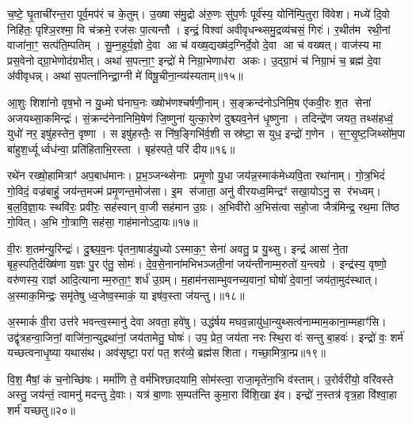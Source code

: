 च॒ष्टे॒ घृ॒ताची॑रन्त॒रा पूर्व॒मप॑रं च के॒तुम्। उ॒ख्षा स॑मु॒द्रो अ॑रु॒णः सु॑प॒र्णः पूर्व॑स्य॒ योनि॑म्पि॒तुरा वि॑वेश। मध्ये॑ दि॒वो निहि॑तः॒ पृश्ञि॒रश्मा॒ वि च॑क्रमे॒ रज॑सः पा॒त्यन्तौ। इन्द्रं॒ विश्वा॑ अवीवृधन्थ्समु॒द्रव्य॑चसं॒ गिरः॑। र॒थीत॑म रथी॒नां वाजा॑ना॒ꣳ॒ सत्प॑ति॒म्पतिम्। सु॒म्न॒हूर्य॒ज्ञो दे॒वा आ च॑ वख्ष॒द्यख्ष॑द॒ग्निर्दे॒वो दे॒वा आ च॑ वख्षत्। वाज॑स्य मा प्रस॒वेनोद्ग्रा॒भेणोद॑ग्रभीत्। अथा॑ स॒पत्ना॒ꣳ॒ इन्द्रो॑ मे निग्रा॒भेणाध॑रा अकः। उ॒द्ग्रा॒भं च॑ निग्रा॒भं च॒ ब्रह्म॑ दे॒वा अ॑वीवृधन्न्। अथा॑ स॒पत्ना॑निन्द्रा॒ग्नी मे॑ विषू॒चीना॒न्व्य॑स्यताम्॥१५॥

{\anuvakamend[{दे॒वाः श॒तप॑या अ॒भि वाज॑स्य॒ षड्विꣳ॑शतिश्च॥३॥}]}

आ॒शुः शिशा॑नो वृष॒भो न यु॒ध्मो घ॑नाघ॒नः ख्षोभ॑णश्चर्\mbox{}षणी॒नाम्। स॒ङ्क्रन्द॑नोऽनिमि॒ष ए॑कवी॒रः श॒त सेना॑ अजयथ्सा॒कमिन्द्रः॑। सं॒क्रन्द॑नेनानिमि॒षेण॑ जि॒ष्णुना॑ युत्का॒रेण॑ दुश्च्यव॒नेन॑ धृ॒ष्णुना। तदिन्द्रे॑ण जयत॒ तथ्स॑हध्वं॒ युधो॑ नर॒ इषु॑हस्तेन॒ वृष्णा। स इषु॑हस्तैः॒ स नि॑ष॒ङ्गिभि॑र्व॒शी सस्र॑ष्टा॒ स युध॒ इन्द्रो॑ ग॒णेन। स॒ꣳ॒सृ॒ष्ट॒जिथ्सो॑म॒पा बा॑हुश॒र्ध्यूर्ध्वध॑न्वा॒ प्रति॑हिताभि॒रस्ता। बृह॑स्पते॒ परि॑ दीय॥१६॥

रथे॑न रख्षो॒हामित्राꣳ॑ अप॒बाध॑मानः। प्र॒भ॒ञ्जन्थ्सेनाः प्रमृ॒णो यु॒धा जय॑न्न॒स्माक॑मेध्यवि॒ता रथा॑नाम्। गो॒त्र॒भिदं॑ गो॒विदं॒ वज्र॑बाहुं॒ जय॑न्त॒मज्म॑ प्रमृ॒णन्त॒मोज॑सा। इ॒म स॑जाता॒ अनु॑ वीरयध्व॒मिन्द्रꣳ॑ सखा॒योऽनु॒ स र॑भध्वम्। ब॒ल॒वि॒ज्ञा॒यः स्थवि॑रः॒ प्रवी॑रः॒ सह॑स्वान् वा॒जी सह॑मान उ॒ग्रः। अ॒भिवी॑रो अ॒भिस॑त्वा सहो॒जा जैत्र॑मिन्द्र॒ रथ॒मा ति॑ष्ठ गो॒वित्। अ॒भि गो॒त्राणि॒ सह॑सा॒ गाह॑मानोऽदा॒यः॥१७॥

वी॒रः श॒तम॑न्यु॒रिन्द्रः॑। दु॒श्च्य॒व॒नः पृ॑तना॒षाड॑यु॒ध्योऽस्माक॒ꣳ॒ सेना॑ अवतु॒ प्र यु॒थ्सु। इन्द्र॑ आसां ने॒ता बृह॒स्पति॒र्दख्षि॑णा य॒ज्ञः पु॒र ए॑तु॒ सोमः॑। दे॒व॒से॒नाना॑मभिभञ्जती॒नां जय॑न्तीनाम्म॒रुतो॑ य॒न्त्वग्रे। इन्द्र॑स्य॒ वृष्णो॒ वरु॑णस्य॒ राज्ञ॑ आदि॒त्यानाम्म॒रुता॒ꣳ॒ शर्ध॑ उ॒ग्रम्। म॒हाम॑नसाम्भुवनच्य॒वानां॒ घोषो॑ दे॒वानां॒ जय॑ता॒मुद॑स्थात्। अ॒स्माक॒मिन्द्रः॒ समृ॑तेषु ध्व॒जेष्व॒स्माकं॒ या इष॑व॒स्ता ज॑यन्तु।॥१८॥

अ॒स्माकं॑ वी॒रा उत्त॑रे भवन्त्व॒स्मानु॑ देवा अवता॒ हवे॑षु। उद्ध॑र्\mbox{}षय मघव॒न्नायु॑धा॒न्युथ्सत्व॑नाम्माम॒काना॒म्महाꣳ॑सि। उद्वृ॑त्रहन्वा॒जिनां॒ वाजि॑ना॒न्युद्रथा॑नां॒ जय॑तामेतु॒ घोषः॑। उप॒ प्रेत॒ जय॑ता नरः स्थि॒रा वः॑ सन्तु बा॒हवः॑। इन्द्रो॑ वः॒ शर्म॑ यच्छत्वनाधृ॒ष्या यथास॑थ। अव॑सृष्टा॒ परा॑ पत॒ शर॑व्ये॒ ब्रह्म॑सशिता। गच्छा॒मित्रा॒न्प्र॥१९॥

वि॒श॒ मैषां॒ कं च॒नोच्छि॑षः। मर्मा॑णि ते॒ वर्म॑भिश्छादयामि॒ सोम॑स्त्वा॒ राजा॒मृते॑ना॒भि व॑स्ताम्। उ॒रोर्वरी॑यो॒ वरि॑वस्ते अस्तु॒ जय॑न्तं॒ त्वामनु॑ मदन्तु दे॒वाः। यत्र॑ बा॒णाः स॒म्पत॑न्ति कुमा॒रा वि॑शि॒खा इ॑व। इन्द्रो॑ न॒स्तत्र॑ वृत्र॒हा वि॑श्वा॒हा शर्म॑ यच्छतु॥२०॥

